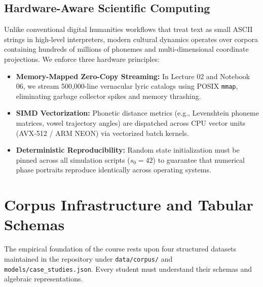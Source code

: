 \documentclass[11pt,letterpaper]{article}
\begin{document}
\subsection{Hardware-Aware Scientific Computing}
Unlike conventional digital humanities workflows that treat text as small ASCII strings in high-level interpreters, modern cultural dynamics operates over corpora containing hundreds of millions of phonemes and multi-dimensional coordinate projections. We enforce three hardware principles:
\begin{itemize}[noitemsep,topsep=2pt]
    \item \textbf{Memory-Mapped Zero-Copy Streaming:} In Lecture 02 and Notebook 06, we stream 500,000-line vernacular lyric catalogs using POSIX \texttt{mmap}, eliminating garbage collector spikes and memory thrashing.
    \item \textbf{SIMD Vectorization:} Phonetic distance metrics (e.g., Levenshtein phoneme matrices, vowel trajectory angles) are dispatched across CPU vector units (AVX-512 / ARM NEON) via vectorized batch kernels.
    \item \textbf{Deterministic Reproducibility:} Random state initialization must be pinned across all simulation scripts ($s_0 = 42$) to guarantee that numerical phase portraits reproduce identically across operating systems.
\end{itemize}

\section{Corpus Infrastructure and Tabular Schemas}

The empirical foundation of the course rests upon four structured datasets maintained in the repository under \texttt{data/corpus/} and \texttt{models/case\_studies.json}. Every student must understand their schemas and algebraic representations.
\end{document}

